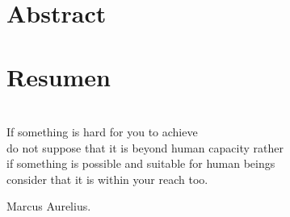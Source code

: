 
\chapter*{Abstract}
\thispagestyle{empty}




\chapter*{Resumen}
\thispagestyle{empty}





\thispagestyle{empty}
\vspace{1cm}




\cleardoublepage %
\chapter*{}
\setlength{\leftmargin}{0.5\textwidth}
\setlength{\parsep}{0cm}
\addtolength{\topsep}{0.5cm}
\begin{flushright}
	\small\em{
		If something is hard for you to achieve \\
		do not suppose that it is beyond human capacity rather\\ 
		if something is possible and suitable for human beings \\
		consider that it is within your reach too.
		
	}
\end{flushright}
\begin{flushright}
	\small{
		Marcus Aurelius.
	}
\end{flushright}
\cleardoublepage %